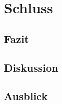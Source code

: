 \chapter{Schluss}
\label{sec:Schluss}

\section{Fazit}
\label{sec:Fazit}

\section{Diskussion}
\label{sec:Diskussion}

\section{Ausblick}
\label{sec:Ausblick}
